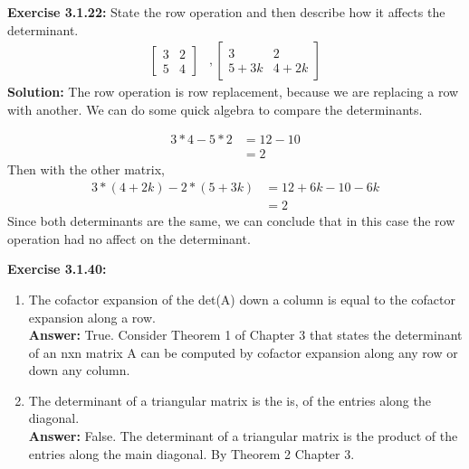 \documentclass{amsart}
\begin{document}
\noindent\textbf{Exercise 3.1.22: } State the row operation and then describe how it affects the determinant. 
\begin{align*}
  \begin{bmatrix}
  3   &2   \\
5  &4    
\end{bmatrix} &, 
 \begin{bmatrix}
  3   &2   \\
5+3k  &4+2k    
\end{bmatrix}
\end{align*}
\noindent \textbf{Solution: } The row operation is row replacement, because we are replacing a row with another. We can do some quick algebra to compare the determinants. 

\begin{align*}
3*4 - 5*2 &= 12 - 10\\
&=2
\end{align*}
Then with the other matrix,
\begin{align*}
 3*(4+2k) - 2*(5+3k)&= 12+6k - 10-6k\\
&=2
\end{align*}
Since both determinants are the same, we can conclude that in this case the row operation had no affect on the determinant.
\vspace{1in}

\noindent\textbf{Exercise 3.1.40: } 
\begin{enumerate}

\item The cofactor expansion of the det(A) down a column is equal to the cofactor expansion along a row.\\
\noindent \textbf{Answer: } True. Consider Theorem 1 of Chapter 3 that states the determinant of an nxn matrix A can be computed by cofactor expansion along any row or down any column.\\
\vspace{1in}


\item The determinant of a triangular matrix is the is, of the entries along the diagonal.\\
\noindent \textbf{Answer: } False. The determinant of a triangular matrix is the product of the entries along the main diagonal. By Theorem 2 Chapter 3.
\vspace{1in} 
\end{enumerate}
\end{document}
